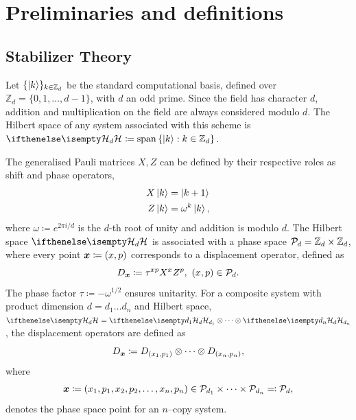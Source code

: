 \documentclass[pra,
aps,
twocolumn,
superscriptaddress,
groupedaddress,
nofootinbib,
reprint
]{revtex4-1}
\begin{document}
\newpage
\section{Preliminaries and definitions}
\label{sec:ps}

\subsection{Stabilizer Theory}\label{sec:so}

Let $\{\ket{k}\}_{k \in \mathbb{Z}_d}$ be the standard computational basis, defined over $\mathbb{Z}_d = \{ 0, 1, \dots,d-1 \}$, with $d$ an odd prime. 
Since the field has character $d$, addition and multiplication on the field are always considered modulo $d$.
The Hilbert space of any system associated with this scheme is $\hd \coloneqq \spanv{\ket{k}: k \in \mathbb{Z}_d}$.

The generalised Pauli matrices $X, Z$ can be defined by their respective roles as shift and phase operators,
\begin{align}
    X \ket{k} &= \ket{k + 1} \label{eq:xpauli}\\
	Z \ket{k} &= \omega^k \ket{k}, \label{eq:zpauli}
\end{align}
where $\omega \coloneqq e^{2\pi i/d}$ is the $d$-th root of unity and addition is modulo $d$. The Hilbert space $\hd$ is associated with a phase space $\cal{P}_d = \mathbb{Z}_d \times \mathbb{Z}_d$, where every point $\bmx \coloneqq (x, p)$ corresponds to a displacement operator, defined as
\begin{equation}\label{eq:ddef}
    D_{\bmx} \coloneqq \tau^{x p} X^{x} Z^{p},\ (x, p) \in \cal{P}_d.
\end{equation}
The phase factor $\tau \coloneqq -\omega^{1/2}$ ensures unitarity.
For a composite system with product dimension $d = d_1 \dots d_n$ and Hilbert space, $\hd = \hd[d_1] \otimes \dots \otimes \hd[d_n]$, the displacement operators are defined as
\begin{equation}\label{eq:composited}
    D_{\bmx} \coloneqq D_{(x_1, p_1)} \otimes \dots \otimes D_{(x_n, p_n)},
\end{equation}
where 
\begin{align*}
	\bmx \coloneqq (x_1, p_1, x_2, p_2, \dots, x_n, p_n) \in \cal{P}_{d_1} \times \dots \times \cal{P}_{d_n} \eqqcolon  \cal{P}_d,
\end{align*}
denotes the phase space point for an $n$--copy system.
\end{document}
